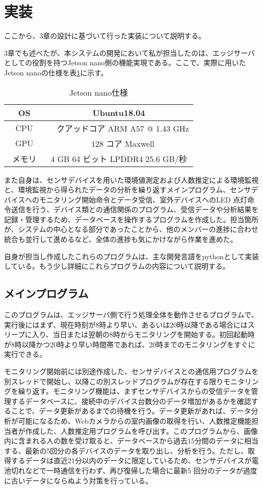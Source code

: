 \section{実装}
ここから、3章の設計に基づいて行った実装について説明する。

3章でも述べたが、本システムの開発において私が担当したのは、エッジサーバとしての役割を持つJetson nano側の機能実現である。ここで、実際に用いたJetson nanoの仕様を表\ref{jetsonnano}に示す。

\begin{table}[H]
	\begin{center}
		\caption{Jetson nano仕様}
		\begin{tabular}{|c||c|} \hline
			OS & Ubuntu18.04\\ \hline
			CPU &　クアッドコア ARM A57 @ 1.43 GHz \\ \hline
			GPU &　128 コア Maxwell\\ \hline
			メモリ　& 4 GB 64 ビット LPDDR4 25.6 GB/秒\\ \hline
		\end{tabular}
		\label{jetsonnano}
	\end{center}
\end{table}

また自身は、センサデバイスを用いた環境値測定および人数推定による環境監視と、環境監視から得られたデータの分析を繰り返すメインプログラム、センサデバイスへのモニタリング開始命令とデータ受信、室外デバイスへのLED 点灯命令送信を行う、デバイス類との通信関係のプログラム、受信データや分析結果を記録・管理するため、データベースを操作するプログラムを作成した。担当箇所が、システムの中心となる部分であったことから、他のメンバーの進捗に合わせ統合も並行して進めるなど、全体の進捗も気にかけながら作業を進めた。

自身が担当し作成したこれらのプログラムは、主な開発言語をpythonとして実装している。もう少し詳細にこれらプログラムの内容について説明する。

\subsection*{メインプログラム}
このプログラムは、エッジサーバ側で行う処理全体を動作させるプログラムで、実行後にはまず、現在時刻が8時より早い、あるいは20時以降である場合にはスリープに入り、当日または翌朝の8時からモニタリングを開始する。初回起動時が8時以降かつ20時より早い時間帯であれば、20時までのモニタリングをすぐに実行できる。

モニタリング開始前には別途作成した、センサデバイスとの通信用プログラムを別スレッドで開始し、以降この別スレッドプログラムが存在する限りモニタリングを繰り返す。モニタリング機能は、まずセンサデバイスからの受信データを管理するデータベースに、接続中のデバイス台数分のデータ増加があるかを確認することで、データ更新があるまでの待機を行う。データ更新があれば、データ分析が可能になるため、Webカメラからの室内画像の取得を行い、人数推定機能担当者が作成した、人数推定用プログラムを呼び出す。このプログラムから、画像内に含まれる人の数を受け取ると、データベースから過去15分間のデータに相当する、最新の5回分の各デバイスのデータを取り出し、分析を行う。ただし、取得するデータは直近21分以内のデータに限定しているため、センサデバイスが電池切れなどで一時通信を行わず、再び復帰した場合に最新5 回分のデータが過度に古いデータにならぬよう対策を行っている。

